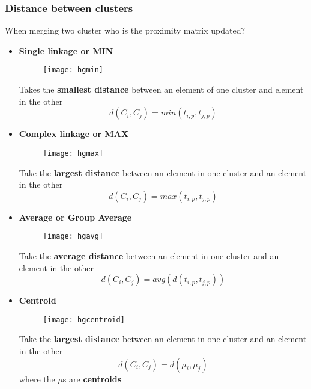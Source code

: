 \subsubsection{Distance between clusters}
When merging two cluster who is the proximity matrix updated?
\begin{itemize}
\item \textbf{Single linkage or MIN}\\
\begin{figure}[H]
  \centering
  \texttt{[image: hgmin]}
\end{figure}
Takes the \textbf{smallest distance} between an element of one cluster  and element in the other $$ d(C_i,C_j) = min (t_{i,p},t_{j,p})$$

\item \textbf{Complex linkage or MAX}\\
\begin{figure}[H]
  \centering
  \texttt{[image: hgmax]}
\end{figure}
Take the \textbf{largest distance} between an element in one cluster and an element in the other $$ d(C_i,C_j) = max (t_{i,p},t_{j,p})$$

\item \textbf{Average or Group Average}\\
\begin{figure}[H]
  \centering
  \texttt{[image: hgavg]}
\end{figure}
Take the \textbf{average distance} between an element in one cluster and an element in the other $$ d(C_i,C_j) = avg (d(t_{i,p},t_{j,p}))$$

\item \textbf{Centroid}\\
\begin{figure}[H]
  \centering
  \texttt{[image: hgcentroid]}
\end{figure}
Take the \textbf{largest distance} between an element in one cluster and an element in the other $$ d(C_i,C_j) = d(\mu_i , \mu_j)$$ where the $\mu$s are \textbf{centroids}
\end{itemize}

